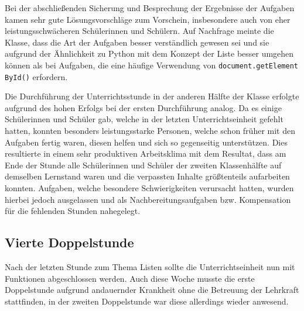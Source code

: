 Bei der abschließenden Sicherung und Besprechung der Ergebnisse der Aufgaben kamen sehr gute Lösungsvorschläge zum Vorschein, insbesondere auch von eher leistungsschwächeren Schülerinnen und Schülern.
Auf Nachfrage meinte die Klasse, dass die Art der Aufgaben besser verständlich gewesen sei und sie aufgrund der Ähnlichkeit zu Python mit dem Konzept der Liste besser umgehen können als bei Aufgaben, die eine häufige Verwendung von \texttt{document.getElement} \texttt{ById()} erfordern.

Die Durchführung der Unterrichtsstunde in der anderen Hälfte der Klasse erfolgte aufgrund des hohen Erfolgs bei der ersten Durchführung analog.
Da es einige Schülerinnen und Schüler gab, welche in der letzten Unterrichtseinheit gefehlt hatten, konnten besonders leistungsstarke Personen, welche schon früher mit den Aufgaben fertig waren, diesen helfen und sich so gegenseitig unterstützen.
Dies resultierte in einem sehr produktiven Arbeitsklima mit dem Resultat, dass am Ende der Stunde alle Schülerinnen und Schüler der zweiten Klassenhälfte auf demselben Lernstand waren und die verpassten Inhalte größtenteils aufarbeiten konnten.
Aufgaben, welche besondere Schwierigkeiten verursacht hatten, wurden hierbei jedoch ausgelassen und als Nachbereitungsaufgaben bzw. Kompensation für die fehlenden Stunden nahegelegt.


\subsection{Vierte Doppelstunde}
\label{subsec:doppelstunde-4}

Nach der letzten Stunde zum Thema Listen sollte die Unterrichtseinheit nun mit Funktionen abgeschlossen werden.
Auch diese Woche musste die erste Doppelstunde aufgrund andauernder Krankheit ohne die Betreuung der Lehrkraft stattfinden, in der zweiten Doppelstunde war diese allerdings wieder anwesend.

